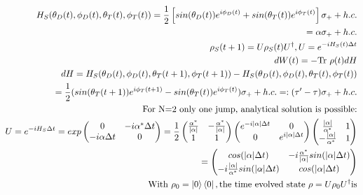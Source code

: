 \documentclass{article}
\begin{document}
	\begin{align*}
		H_S(\theta_D(t), \phi_D(t), \theta_T(t), \phi_T(t)) = \frac{1}{2} \left[sin(\theta_D(t)) e^{i\phi_D(t)} + sin(\theta_T(t)) e^{i\phi_T(t)}\right] \sigma_{+} + h.c. \\
		= \alpha \sigma_{+} + h.c. \\
		\rho_S(t+1) = U \rho_S(t) U^\dagger, U = e^{-iH_S(t) \Delta t} \\
		dW(t) = -\textrm{Tr} \ \rho(t) dH \\
		dH = H_S(\theta_D(t), \phi_D(t), \theta_T(t+1), \phi_T(t+1)) - H_S(\theta_D(t), \phi_D(t), \theta_T(t), \phi_T(t)) \\
		= \frac{1}{2}(sin(\theta_T(t+1))e^{i\phi_T(t+1)} - sin(\theta_T(t))e^{i\phi_T(t)}) \sigma_{+} + h.c. =: (\tau' - \tau) \sigma_{+} + h.c. \\
		\textrm{For N=2 only one jump, analytical solution is possible:} \\
		U = e^{-iH_S \Delta t} = 
		exp \begin{pmatrix}
		0 & -i\alpha^* \Delta t \\
		-i \alpha \Delta t & 0 \\
		\end{pmatrix} = 
		\frac{1}{2} \begin{pmatrix}
		\frac{\alpha^*}{\abs{\alpha}} & -\frac{\alpha^*}{\abs{\alpha}} \\
		1 & 1 \\
		\end{pmatrix}
		\begin{pmatrix}
		e^{-i\abs{\alpha} \Delta t} & 0 \\
		0 & e^{i\abs{\alpha} \Delta t} \\
		\end{pmatrix}
		\begin{pmatrix}
		\frac{\abs{\alpha}}{\alpha^*} & 1 \\
		-\frac{\abs{\alpha}}{\alpha^*} & 1 \\
		\end{pmatrix} \\
		= \begin{pmatrix}
		cos(\abs{\alpha}\Delta t) & -i\frac{\alpha^*}{\abs{\alpha}} sin(\abs{\alpha}\Delta t) \\
		-i\frac{\abs{\alpha}}{\alpha^*} sin(\abs{\alpha}\Delta t) & cos(\abs{\alpha} \Delta t) \\
		\end{pmatrix} \\
		\mathrm{With} \ \rho_0 = \ket{0}\bra{0}, \mathrm{the \ time \ evolved \ state} \ \rho = U \rho_0 U^\dagger \mathrm{is} \\

\end{align*}
\end{document}
